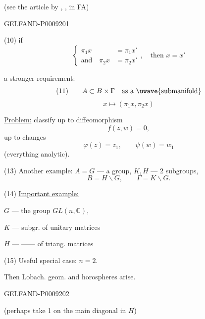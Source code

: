 (see the article by , ,  in FA)


\begin{GelfandAdjacentEvidence}{GELFAND-P000920}{1}

(10)  if
\begin{equation*}
 \left\{\begin{aligned}
 \pi_1x&=\pi_1x'\\
 \text{and}\quad\pi_2x&=\pi_2x'
 \end{aligned}\right.
 ,\quad\text{then }x=x'
\end{equation*}

a stronger requirement:
\begin{equation*}
 (11)\qquad A\subset B\times\Gamma\quad\text{as a \uwave{submanifold}}
\end{equation*}
\begin{equation*}
 x\mapsto(\pi_1x,\pi_2x)
\end{equation*}

\uline{Problem:} classify up to diffeomorphism
\begin{equation*}
 f(z,w)=0,
 \tag{12}
\end{equation*}
up to changes
\begin{equation*}
 \varphi(z)=z_1,\qquad\psi(w)=w_1
\end{equation*}
(everything analytic).

(13) Another example: $A=G$ --- a group, $K,H$ --- 2 subgroups,
\begin{equation*}
 B=H\backslash G,\qquad\Gamma=K\backslash G.
\end{equation*}

(14) \uline{Important example:}

$G$ --- the group $GL(n,\mathbb C)$,

$K$ --- subgr. of unitary matrices

$H$ --- —\raisebox{-.15ex}{\(\scriptstyle\prime\prime\)}— of triang. matrices

(15) Useful special case: $n=2$.

Then Lobach. geom. and horospheres arise.
\end{GelfandAdjacentEvidence}
\begin{GelfandAdjacentEvidence}{GELFAND-P000920}{2}


(perhaps take 1 on the main diagonal in $H$)
\end{GelfandAdjacentEvidence}
